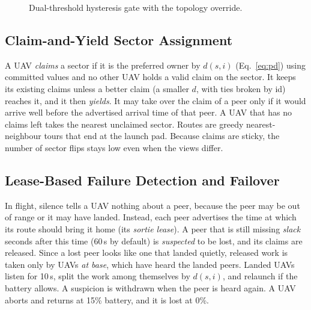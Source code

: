 \documentclass[10pt,letterpaper]{article}
\begin{document}
\begin{figure}[htbp]
\centering
{}
\caption{Dual-threshold hysteresis gate with the topology override.}\label{fig:hyst-flow}
\end{figure}

\subsection{Claim-and-Yield Sector Assignment}
A UAV \emph{claims} a sector if it is the preferred owner by $d(s,i)$ (Eq.~\ref{eq:pd}) using committed values and no other UAV holds a valid claim on the sector. It keeps its existing claims unless a better claim (a smaller $d$, with ties broken by id) reaches it, and it then \emph{yields}. It may take over the claim of a peer only if it would arrive well before the advertised arrival time of that peer. A UAV that has no claims left takes the nearest unclaimed sector. Routes are greedy nearest-neighbour tours that end at the launch pad. Because claims are sticky, the number of sector flips stays low even when the views differ.

\subsection{Lease-Based Failure Detection and Failover}
In flight, silence tells a UAV nothing about a peer, because the peer may be out of range or it may have landed. Instead, each peer advertises the time at which its route should bring it home (its \emph{sortie lease}). A peer that is still missing \textit{slack} seconds after this time (60\,s by default) is \emph{suspected} to be lost, and its claims are released. Since a lost peer looks like one that landed quietly, released work is taken only by UAVs \emph{at base}, which have heard the landed peers. Landed UAVs listen for 10\,s, split the work among themselves by $d(s,i)$, and relaunch if the battery allows. A suspicion is withdrawn when the peer is heard again. A UAV aborts and returns at 15\% battery, and it is lost at 0\%.
\end{document}
